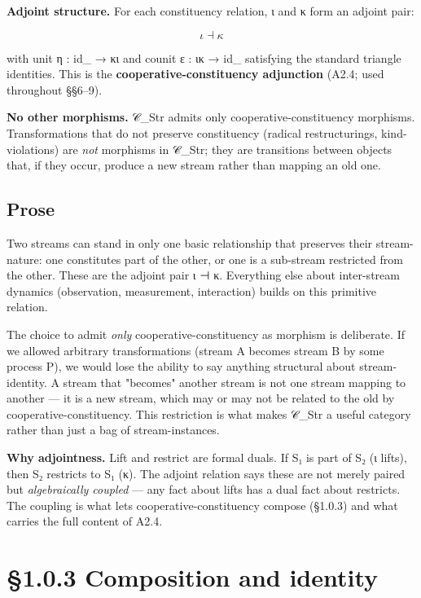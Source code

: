 \documentclass[11pt, openany]{book}
\newcommand{\sectionbreak}{\clearpage}
\begin{document}
\textbf{Adjoint structure.} For each constituency relation, ι and κ form an adjoint pair:

$$\iota \dashv \kappa$$

with unit η : id\_ → κι and counit ε : ικ → id\_ satisfying the standard triangle identities. This is the \textbf{cooperative-constituency adjunction} (A2.4; used throughout §§6–9).

\textbf{No other morphisms.} 𝒞\_\allowbreak{}Str admits only cooperative-constituency morphisms. Transformations that do not preserve constituency (radical restructurings, kind-violations) are \textit{not} morphisms in 𝒞\_\allowbreak{}Str; they are transitions between objects that, if they occur, produce a new stream rather than mapping an old one.

\subsection{Prose}

Two streams can stand in only one basic relationship that preserves their stream-nature: one constitutes part of the other, or one is a sub-stream restricted from the other. These are the adjoint pair ι ⊣ κ. Everything else about inter-stream dynamics (observation, measurement, interaction) builds on this primitive relation.

The choice to admit \textit{only} cooperative-constituency as morphism is deliberate. If we allowed arbitrary transformations (stream A becomes stream B by some process P), we would lose the ability to say anything structural about stream-identity. A stream that "becomes" another stream is not one stream mapping to another --- it is a new stream, which may or may not be related to the old by cooperative-constituency. This restriction is what makes 𝒞\_\allowbreak{}Str a useful category rather than just a bag of stream-instances.

\textbf{Why adjointness.} Lift and restrict are formal duals. If S₁ is part of S₂ (ι lifts), then S₂ restricts to S₁ (κ). The adjoint relation says these are not merely paired but \textit{algebraically coupled} --- any fact about lifts has a dual fact about restricts. The coupling is what lets cooperative-constituency compose (§1.0.3) and what carries the full content of A2.4.

\sectionbreak

\section{§1.0.3 Composition and identity}
\end{document}
